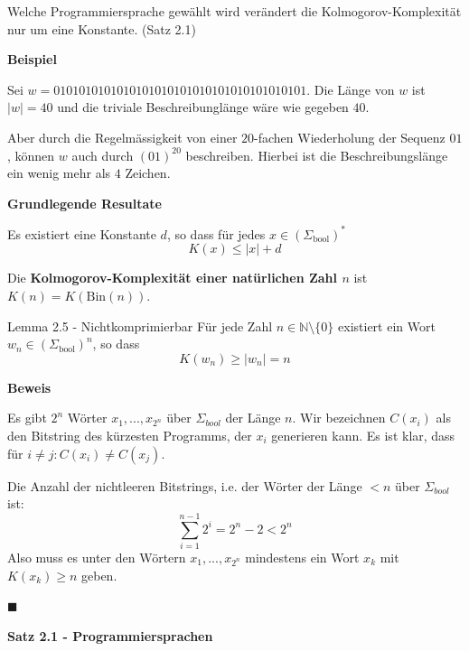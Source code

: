 \documentclass[a4paper, 11pt]{article}
\def\N{\mathbb{N}}
\begin{document}
        Welche Programmiersprache gewählt wird verändert die Kolmogorov-Komplexität nur um eine Konstante. (Satz 2.1)
    
    
    
        \textbf{Beispiel}
        
        Sei $w = 0101010101010101010101010101010101010101$. Die Länge von $w$ ist $|w| = 40$ und die triviale Beschreibunglänge wäre wie gegeben $40$.
    
        Aber durch die Regelmässigkeit von einer $20$-fachen Wiederholung der Sequenz $01$, können $w$ auch durch $(01)^{20}$ beschreiben. 
        Hierbei ist die Beschreibungslänge ein wenig mehr als $4$ Zeichen.
    
    
    
        \textbf{Grundlegende Resultate}
        \begin{mainbox}{}
            Es existiert eine Konstante $d$, so dass für jedes $x \in (\Sigma_{\text{bool}})^*$
            $$K(x) \leq |x| + d$$
        \end{mainbox}
    
        \begin{mainbox}{}
            Die \textbf{Kolmogorov-Komplexität einer natürlichen Zahl $n$} ist $K(n) = K(\text{Bin}(n))$.
        \end{mainbox}
    
        
        \begin{mainbox}{Lemma 2.5 - Nichtkomprimierbar}
            Für jede Zahl $n \in \N \setminus\{0\}$ existiert ein Wort $w_n \in (\Sigma_{\text{bool}})^n$, so dass 
            $$K(w_n) \geq |w_n| = n$$
        \end{mainbox}
        \textbf{Beweis}

        Es gibt $2^n$ Wörter $x_1, ..., x_{2^n}$ über $\Sigma_{bool}$ der Länge $n$. 
        Wir bezeichnen $C(x_i)$ als den Bitstring des kürzesten Programms, der $x_i$ generieren kann. Es ist klar, dass für $i \neq j: C(x_i) \neq C(x_j)$.
    
        Die Anzahl der nichtleeren Bitstrings, i.e. der Wörter der Länge $< n$ über $\Sigma_{bool}$ ist:
        $$\sum_{i = 1}^{n-1} 2^i = 2^n - 2 < 2^n$$
        Also muss es unter den Wörtern $x_1, ...,x_{2^n}$ mindestens ein Wort $x_k$ mit $K(x_k) \geq n$ geben.
        
        \hspace*{0pt}\hfill$\blacksquare$
    
    
    
        \textbf{Satz 2.1 - Programmiersprachen}
\end{document}
